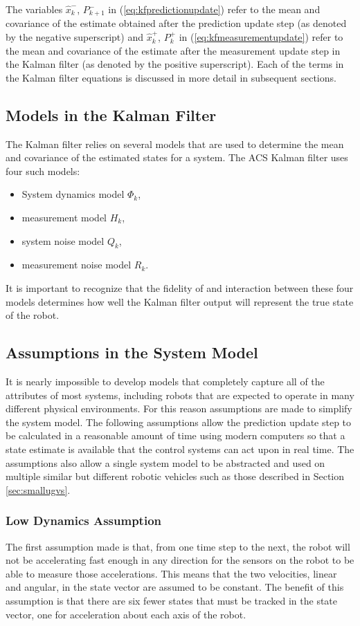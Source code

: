 The variables $\hat{x}_k^-$, $P_{k+1}^-$ in (\ref{eq:kfpredictionupdate}) refer to the mean and covariance of the estimate obtained after the prediction update step (as denoted by the negative superscript) and $\hat{x}_k^+$, $P_{k}^+$ in (\ref{eq:kfmeasurementupdate}) refer to the mean and covariance of the estimate after the measurement update step in the Kalman filter (as denoted by the positive superscript). Each of the terms in the Kalman filter equations is discussed in more detail in subsequent sections.

\subsection{Models in the Kalman Filter}
\label{sec:kfModels}
The Kalman filter relies on several models that are used to determine the mean and covariance of the estimated states for a system. The ACS Kalman filter uses four such models:
\begin{itemize}
\item System dynamics model $\Phi_k$,
\item measurement model $H_k$,
\item system noise model $Q_k$,
\item measurement noise model $R_k$.
\end{itemize}

It is important to recognize that the fidelity of and interaction between these four models determines how well the Kalman filter output will represent the true state of the robot.

\subsection{Assumptions in the System Model}
\label{sec:kfAssumptions}
It is nearly impossible to develop models that completely capture all of the attributes of most systems, including robots that are expected to operate in many different physical environments. For this reason assumptions are made to simplify the system model. The following assumptions allow the prediction update step to be calculated in a reasonable amount of time using modern computers so that a state estimate is available that the control systems can act upon in real time. The assumptions also allow a single system model to be abstracted and used on multiple similar but different robotic vehicles such as those described in Section \ref{sec:smallugvs}.

\subsubsection{Low Dynamics Assumption}
\label{sec:kfLowDynamicsAssumption}
The first assumption made is that, from one time step to the next, the robot will not be accelerating fast enough in any direction for the sensors on the robot to be able to measure those accelerations. This means that the two velocities, linear and angular, in the state vector are assumed to be constant. The benefit of this assumption is that there are six fewer states that must be tracked in the state vector, one for acceleration about each axis of the robot.

